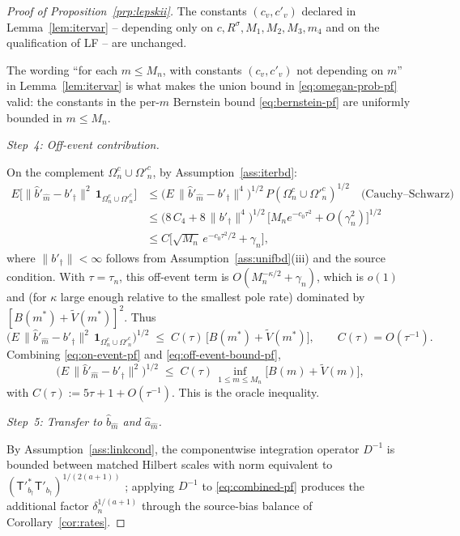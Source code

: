 \begin{proof}[Proof of Proposition~\ref{prp:lepskii}]
The constants $(c_v, c'_v)$ declared in
Lemma~\ref{lem:itervar} -- depending only on
$c, R^\sigma, M_1, M_2, M_3, m_4$ %
and on the qualification of LF -- are unchanged.

The wording ``for each $m \le M_n$, with constants $(c_v, c'_v)$ not
depending on $m$'' in Lemma~\ref{lem:itervar} %
is what makes the union bound in \eqref{eq:omegan-prob-pf} valid: the
constants in the per-$m$ Bernstein bound \eqref{eq:bernstein-pf} are
uniformly bounded in $m \le M_n$.

\smallskip
\emph{Step~4: Off-event contribution.}

On the complement $\Omega_n^c \cup \Omega'^c_n$, by
Assumption~\ref{ass:iterbd}: %
\begin{align*}
E\!\bigl[\|\hat b'_{\hat m} - b'_\dagger\|^2\,\mathbf 1_{\Omega_n^c \cup \Omega'^c_n}\bigr]
&\le \bigl(E\,\|\hat b'_{\hat m} - b'_\dagger\|^4\bigr)^{1/2}\,
     P(\Omega_n^c \cup \Omega'^c_n)^{1/2}
   \quad \text{(Cauchy--Schwarz)} \\
&\le \bigl(8\,C_4 + 8\,\|b'_\dagger\|^4\bigr)^{1/2}\,
   \bigl[M_n e^{-c_0\tau^2} + O(\gamma_n^2)\bigr]^{1/2} \\
&\le C\bigl[\sqrt{M_n}\,e^{-c_0\tau^2/2} + \gamma_n\bigr],
\end{align*}
where $\|b'_\dagger\| < \infty$ follows from
Assumption~\ref{ass:unifbd}\textup{(iii)} and the source condition. With
$\tau = \tau_n$, this off-event term is $O(M_n^{-\kappa/2} + \gamma_n)$,
which is $o(1)$ and (for $\kappa$ large enough relative to the smallest
pole rate) dominated by $[B(m^*) + \tilde V(m^*)]^2$. Thus
\begin{equation}\label{eq:off-event-bound-pf}
\bigl(E\,\|\hat b'_{\hat m} - b'_\dagger\|^2\,
\mathbf 1_{\Omega_n^c \cup \Omega'^c_n}\bigr)^{1/2}
\;\le\; C(\tau)\,\bigl[B(m^*) + \tilde V(m^*)\bigr],
\qquad C(\tau) = O(\tau^{-1}).
\end{equation}
Combining \eqref{eq:on-event-pf} and \eqref{eq:off-event-bound-pf},
\begin{equation}\label{eq:combined-pf}
\bigl(E\,\|\hat b'_{\hat m} - b'_\dagger\|^2\bigr)^{1/2}
\;\le\; C(\tau)\,\inf_{1 \le m \le M_n}\bigl[B(m) + \tilde V(m)\bigr],
\end{equation}
with $C(\tau) := 5\tau + 1 + O(\tau^{-1})$. This is the oracle inequality.

\smallskip
\emph{Step~5: Transfer to $\hat b_{\hat m}$ and $\hat a_{\hat m}$.}

By Assumption~\ref{ass:linkcond}, the componentwise integration operator
$D^{-1}$ is bounded between matched Hilbert scales with norm equivalent to
$(\mathsf{T}'^*_{b_\dagger}\mathsf{T}'_{b_\dagger})^{1/(2(a+1))}$
\citep{florens2012}; %
applying $D^{-1}$ to \eqref{eq:combined-pf} produces the additional factor
$\delta_n^{1/(a+1)}$ through the source-bias balance of
Corollary~\ref{cor:rates}.


\end{proof}
